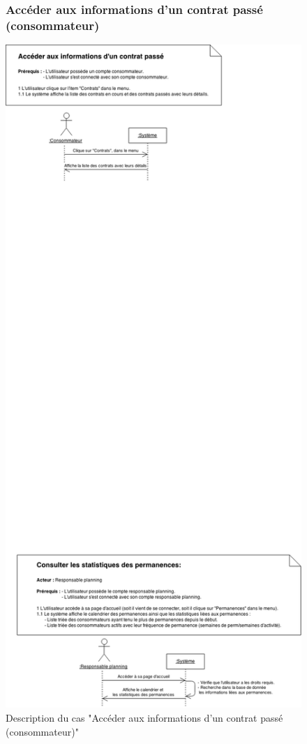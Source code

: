 \documentclass[12pt]{report}
\begin{document}
\begin{figure}[!h]
\centering
\subsubsection{Accéder aux informations d'un contrat passé (consommateur)~~~~~~~~~~~~~~~~~~~~~~~~~~~}
\includegraphics[width=1.\textwidth]{./ressources/desc_UC_contrats_passes_conso.png}
\caption{Description du cas "Accéder aux informations d'un contrat passé (consommateur)"}
\end{figure}
\clearpage
\end{document}
